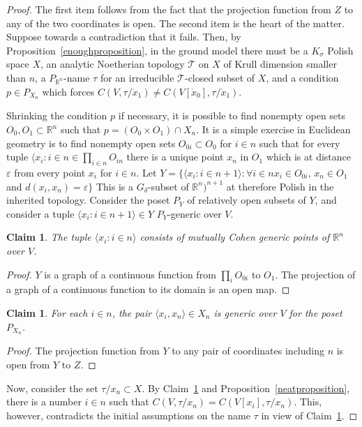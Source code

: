 \documentclass{article}
\newcommand{\gd}{\delta}
\newcommand{\gs}{\sigma}
\newcommand{\eps}{\varepsilon}
\newtheorem{claim}[theorem]{Claim}
\theoremstyle{definition}
\begin{document}
\begin{proof}
The first item follows from the fact that the projection function from $Z$ to any of the two coordinates is open. The second item is the heart of the matter. Suppose towards a contradiction that it fails. Then, by Proposition~\ref{enoughproposition}, in the ground model there must be a $K_\gs$ Polish space $X$, an analytic Noetherian topology $\mathcal{T}$ on $X$ of Krull dimension smaller than $n$, a $P_{\mathbb{R}^n}$-name $\tau$ for an irreducible $\mathcal{T}$-closed subset of $X$, and a condition $p\in P_{X_n}$ which forces $C(V, \tau/\dot x_1)\neq C(V[\dot x_0], \tau/\dot x_1)$.

Shrinking the condition $p$ if necessary, it is possible to find nonempty open sets $O_0, O_1\subset\mathbb{R}^n$ such that $p=(O_0\times O_1)\cap X_n$. It is a simple exercise in Euclidean geometry \cite[Claim 4.9]{z:krull} is to find nonempty open sets $O_{0i}\subset O_0$ for $i\in n$ such that for every tuple $\langle x_i\colon i\in n\in\prod_{i\in n}O_{in}$ there is a unique point $x_n$ in $O_1$ which is at distance $\eps$ from every point $x_i$ for $i\in n$. Let $Y=\{\langle x_i\colon i\in n+1\rangle\colon \forall i\in n x_i\in O_{0i}$, $x_n\in O_1$ and $d(x_i, x_n)=\eps\}$ This is a $G_\gd$-subset of $\mathbb{R}^n)^{n+1}$ at therefore Polish in the inherited topology. Consider the poset $P_Y$ of relatively open subsets of $Y$, and consider a tuple $\langle x_i\colon i\in n+1\rangle\in Y$ $P_Y$-generic over $V$.

\begin{claim}
\label{mutualclaim}
The tuple $\langle x_i\colon i\in n\rangle$ consists of mutually Cohen generic points of $\mathbb{R}^n$ over $V$.
\end{claim}

\begin{proof}
$Y$ is a graph of a continuous function from $\prod_iO_{0i}$ to $O_1$. The projection of a graph of a continuous function to its domain is an open map.
\end{proof}


\begin{claim}
\label{secondclaim}
For each $i\in n$, the pair $\langle x_i, x_n\rangle\in X_n$ is generic over $V$ for the poset $P_{X_n}$.
\end{claim}

\begin{proof}
The projection function from $Y$ to any pair of coordinates including $n$ is open from $Y$ to $Z$.
\end{proof}


\noindent Now, consider the set $\tau/x_n\subset X$. By Claim~\ref{mutualclaim} and Proposition~\ref{neatproposition}, there is a number $i\in n$ such that $C(V, \tau/x_n)=C(V[x_i], \tau/x_n)$. This, however, contradicts the initial assumptions on the name $\tau$ in view of Claim~\ref{secondclaim}.
\end{proof}
\end{document}
